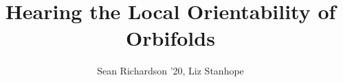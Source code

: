 \documentclass[final]{beamer}
\title{Hearing the Local Orientability of Orbifolds} %
\author{Sean Richardson '20, Liz Stanhope} %
\institute{Lewis \& Clark College} %
\newlength{\onecolwid}
\begin{document}
\begin{frame}[t] %
\begin{columns}[t] %

    \begin{column}[t]{\onecolwid}
        \lipsum[1-3]
    \end{column}
    \begin{column}[t]{\onecolwid}
        \lipsum[1-3]
    \end{column}
    \begin{column}[t]{\onecolwid}
        \lipsum[1-3]
    \end{column}


\end{columns}
\end{frame}
\end{document}
